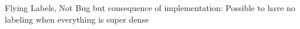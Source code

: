 Flying Labels,
Not Bug but consequence of implementation: Possible to have no labeling when everything is super dense